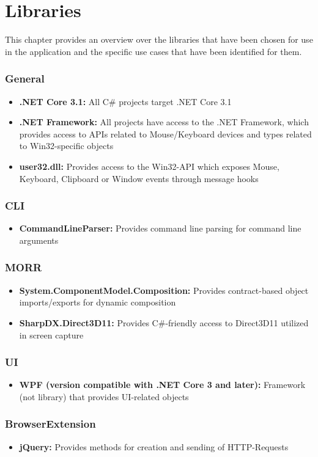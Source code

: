 \chapter{Libraries}
\label{ch:libraries}

\newcommand{\lib}[2]{\item{\textbf{#1: }{#2}}}

This chapter provides an overview over the libraries that have been chosen for use in the application and the specific use cases that have been identified for them.

\subsection*{General}

\begin{itemize}
    \lib{.NET Core 3.1}{All C\# projects target .NET Core 3.1}
    \lib{.NET Framework}{All projects have access to the .NET Framework, which provides access to APIs related to Mouse/Keyboard devices and types related to Win32-specific objects}
    \lib{user32.dll}{Provides access to the Win32-API which exposes Mouse, Keyboard, Clipboard or Window events through message hooks}
\end{itemize}

\subsection*{CLI}

\begin{itemize}
    \lib{CommandLineParser}{Provides command line parsing for command line arguments}
\end{itemize}

\subsection*{MORR}

\begin{itemize}
    \lib{System.ComponentModel.Composition}{Provides contract-based object imports/exports for dynamic composition}
    \lib{SharpDX.Direct3D11}{Provides C\#-friendly access to Direct3D11 utilized in screen capture}
\end{itemize}

\subsection*{UI}

\begin{itemize}
    \lib{WPF (version compatible with .NET Core 3 and later)}{Framework (not library) that provides UI-related objects}
\end{itemize}

\subsection*{BrowserExtension}

\begin{itemize}
    \lib{jQuery}{Provides methods for creation and sending of HTTP-Requests}
\end{itemize}